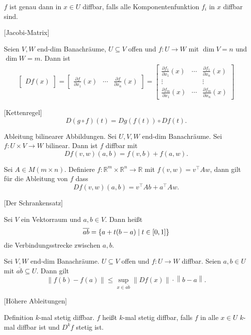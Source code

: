 \documentclass[fleqn,draft,a5paper]{article}
\providecommand{\norm}[1]{\left\lVert#1\right\rVert}
\theoremstyle{remark}
\begin{document}
\(f\) ist genau dann in \(x \in U\) diffbar, falls alle Komponentenfunktion
\(f_{i}\) in \(x\) diffbar sind.

[Jacobi-Matrix]

Seien \(V, W\) end-dim Banachräume, \(U \subseteq V\) offen und \(f\colon U \to W\) mit
\(\dim V = n\) und \(\dim W = m\).  Dann ist
\begin{align*}
  \begin{bmatrix}
    Df(x)
  \end{bmatrix}
  =
  \begin{bmatrix}
    \frac{\partial f}{\partial x_{1}}(x) & \cdots & \frac{\partial f}{\partial x_{n}}(x)
  \end{bmatrix}
  =
  \begin{bmatrix}
    \frac{\partial f_{1}}{\partial x_{1}}(x) & \cdots & \frac{\partial f_{1}}{\partial x_{n}}(x) \\
    \vdots &  & \vdots \\
    \frac{\partial f_{m}}{\partial x_{1}}(x) & \cdots & \frac{\partial f_{m}}{\partial x_{n}}(x)
  \end{bmatrix}
\end{align*}

[Kettenregel]
\[D(g \circ f)(t) = Dg(f(t)) \circ Df(t).\]

Ableitung bilinearer Abbildungen.  Sei \(U, V, W\) end-dim
Banachräume. Sei \(f\colon U \times V \to W\) bilinear.  Dann ist \(f\) diffbar
mit
\[Df(v,w)(a,b) = f(v,b) + f(a,w).\]

Sei \(A \in M(m \times n)\).  Definiere \(f\colon \mathbb{R}^{m} \times \mathbb{R}^{n} \to \mathbb{R}\) mit \(f(v,w) =
v^{\top} A w\), dann gilt für die Ableitung von \(f\) dass
\[Df(v,w)(a,b) = v^{\top}Ab + a^{\top} A w.\]

[Der Schrankensatz]

Sei \(V\) ein Vektorraum und \(a, b \in V\).  Dann heißt
\[\overline{ab} = \{a+t(b-a)\mid t \in \interval{0}{1}\}\]
die Verbindungsstrecke zwischen \(a, b\).

Sei \(V, W\) end-dim Banachräume. \(U \subseteq V\) offen und \(f\colon U \to W\) diffbar.
Seien \(a, b \in U\) mit \(\overline{ab} \subseteq U\).  Dann gilt
\[\norm{f(b)-f(a)}\le \sup_{x \in \overline{ab}}\norm{Df(x)}\cdot\norm{b-a}.\]

[Höhere Ableitungen]

Definition \(k\)-mal stetig diffbar. \(f\) heißt \(k\)-mal stetig diffbar,
falls \(f\) in alle \(x \in U\) \(k\)-mal diffbar ist und \(D^{k}f\) stetig ist.
\end{document}
